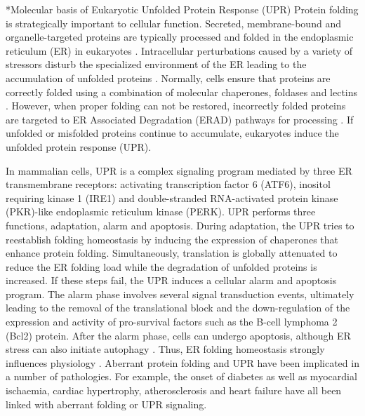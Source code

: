 \documentclass[12pt]{article}
\makeatletter
\renewcommand\section{\@startsection
	{subsection}{2}{0mm}
	{-0.2in}
	{0.05\baselineskip}
	{\normalfont\normalsize\bfseries}}
\makeatother
\begin{document}
\setcounter{page}{1}

\section*{Molecular basis of Eukaryotic Unfolded Protein Response (UPR)}
Protein folding is strategically important to cellular function. Secreted, membrane-bound and organelle-targeted proteins are typically processed and folded in the endoplasmic reticulum (ER) in eukaryotes \citep{naidoo2009er,ron2002translational,kaufman2002unfolded}. Intracellular perturbations caused by a variety of stressors disturb the specialized environment of the ER leading to the accumulation of unfolded proteins \citep{ellgaard2003qce,Fonseca:2009fk}. Normally, cells ensure that proteins are correctly folded using a combination of molecular chaperones, foldases and lectins \citep{naidoo2009er}. However, when proper folding can not be restored, incorrectly folded proteins are targeted to ER Associated Degradation (ERAD) pathways for processing \citep{kaufman2002unfolded}. If unfolded or misfolded proteins continue to accumulate, eukaryotes induce the unfolded protein response (UPR).

In mammalian cells, UPR is a complex signaling program mediated by three ER transmembrane receptors: activating transcription factor 6 (ATF6), inositol requiring kinase 1 (IRE1) and double-stranded RNA-activated protein kinase (PKR)-like endoplasmic reticulum kinase (PERK). UPR performs three functions, adaptation, alarm and apoptosis. During adaptation, the UPR tries to reestablish folding homeostasis by inducing the expression of chaperones that enhance protein folding. Simultaneously, translation is globally attenuated to reduce the ER folding load while the degradation of unfolded proteins is increased. If these steps fail, the UPR induces a cellular alarm and apoptosis program. The alarm phase involves several signal transduction events, ultimately leading to the removal of the translational block and the down-regulation of the expression and activity of pro-survival factors such as the B-cell lymphoma 2 (Bcl2) protein. After the alarm phase, cells can undergo apoptosis, although ER stress can also initiate autophagy \citep{ogata2006aac,yorimitsu2006ers,bernales2006ace,kamimoto2006iic,hoyerhansen2007cmc,kouroku2006esp,fujita2007ter}. Thus, ER folding homeostasis strongly influences physiology \citep{Fonseca:2009fk}. Aberrant protein folding and UPR have been implicated in a number of pathologies. For example, the onset of diabetes \citep{schnell2009model} as well as myocardial ischaemia, cardiac hypertrophy, atherosclerosis and heart failure \citep{glembotski2007ers} have all been linked with aberrant folding or UPR signaling. 
\end{document}
